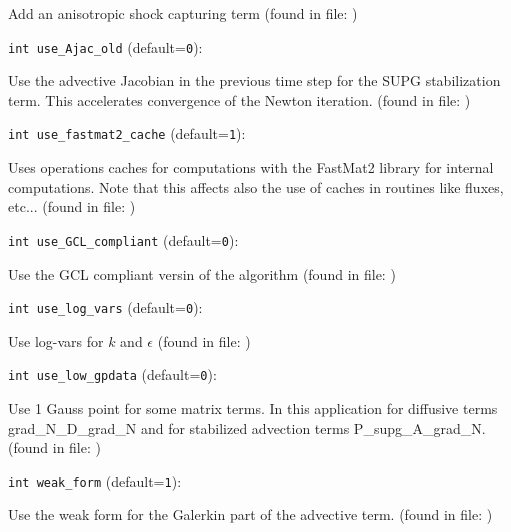 Add an anisotropic shock capturing term
 (found in file: \verb++)
\item\verb+int use_Ajac_old+ {\rm(default=\verb|0|)}:

Use the advective Jacobian in the previous time step
 for the SUPG stabilization term. This accelerates
 convergence of the Newton iteration.
 (found in file: \verb++)
\item\verb+int use_fastmat2_cache+ {\rm(default=\verb|1|)}:

Uses operations caches for computations with the FastMat2
 library for internal computations. Note that this affects also the
 use of caches in routines like fluxes, etc...
 (found in file: \verb++)
\item\verb+int use_GCL_compliant+ {\rm(default=\verb|0|)}:

Use the GCL compliant versin of the algorithm 
 (found in file: \verb++)
\item\verb+int use_log_vars+ {\rm(default=\verb|0|)}:

Use log-vars for $k$ and $\epsilon$
 (found in file: \verb++)
\item\verb+int use_low_gpdata+ {\rm(default=\verb|0|)}:

Use 1 Gauss point for some matrix terms.
In this application for diffusive terms grad_N_D_grad_N
and for stabilized advection terms P_supg_A_grad_N.
 (found in file: \verb++)
\item\verb+int weak_form+ {\rm(default=\verb|1|)}:

Use the weak form for the Galerkin part of the advective term.
 (found in file: \verb++)
